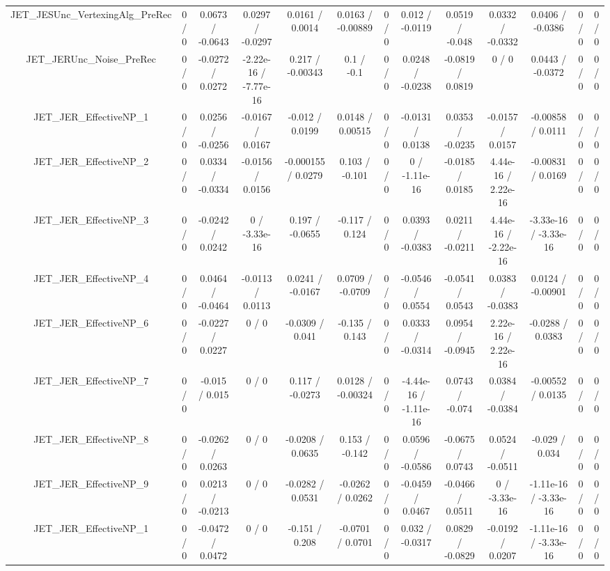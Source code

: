 \documentclass[10pt]{article}
\begin{document}
\begin{table}[htbp]
\begin{center}
\begin{tabular}{|c|c|c|c|c|c|c|c|c|c|c|c|c|}
  JET_JESUnc_VertexingAlg_PreRec & 0 / 0 & 0.0673 / -0.0643 & 0.0297 / -0.0297 & 0.0161 / 0.0014 & 0.0163 / -0.00889 & 0 / 0 & 0.012 / -0.0119 & 0.0519 / -0.048 & 0.0332 / -0.0332 & 0.0406 / -0.0386 & 0 / 0 & 0 / 0 \\ 
  JET_JERUnc_Noise_PreRec & 0 / 0 & -0.0272 / 0.0272 & -2.22e-16 / -7.77e-16 & 0.217 / -0.00343 & 0.1 / -0.1 & 0 / 0 & 0.0248 / -0.0238 & -0.0819 / 0.0819 & 0 / 0 & 0.0443 / -0.0372 & 0 / 0 & 0 / 0 \\ 
  JET_JER_EffectiveNP_1 & 0 / 0 & 0.0256 / -0.0256 & -0.0167 / 0.0167 & -0.012 / 0.0199 & 0.0148 / 0.00515 & 0 / 0 & -0.0131 / 0.0138 & 0.0353 / -0.0235 & -0.0157 / 0.0157 & -0.00858 / 0.0111 & 0 / 0 & 0 / 0 \\ 
  JET_JER_EffectiveNP_2 & 0 / 0 & 0.0334 / -0.0334 & -0.0156 / 0.0156 & -0.000155 / 0.0279 & 0.103 / -0.101 & 0 / 0 & 0 / -1.11e-16 & -0.0185 / 0.0185 & 4.44e-16 / 2.22e-16 & -0.00831 / 0.0169 & 0 / 0 & 0 / 0 \\ 
  JET_JER_EffectiveNP_3 & 0 / 0 & -0.0242 / 0.0242 & 0 / -3.33e-16 & 0.197 / -0.0655 & -0.117 / 0.124 & 0 / 0 & 0.0393 / -0.0383 & 0.0211 / -0.0211 & 4.44e-16 / -2.22e-16 & -3.33e-16 / -3.33e-16 & 0 / 0 & 0 / 0 \\ 
  JET_JER_EffectiveNP_4 & 0 / 0 & 0.0464 / -0.0464 & -0.0113 / 0.0113 & 0.0241 / -0.0167 & 0.0709 / -0.0709 & 0 / 0 & -0.0546 / 0.0554 & -0.0541 / 0.0543 & 0.0383 / -0.0383 & 0.0124 / -0.00901 & 0 / 0 & 0 / 0 \\ 
  JET_JER_EffectiveNP_6 & 0 / 0 & -0.0227 / 0.0227 & 0 / 0 & -0.0309 / 0.041 & -0.135 / 0.143 & 0 / 0 & 0.0333 / -0.0314 & 0.0954 / -0.0945 & 2.22e-16 / 2.22e-16 & -0.0288 / 0.0383 & 0 / 0 & 0 / 0 \\ 
  JET_JER_EffectiveNP_7 & 0 / 0 & -0.015 / 0.015 & 0 / 0 & 0.117 / -0.0273 & 0.0128 / -0.00324 & 0 / 0 & -4.44e-16 / -1.11e-16 & 0.0743 / -0.074 & 0.0384 / -0.0384 & -0.00552 / 0.0135 & 0 / 0 & 0 / 0 \\ 
  JET_JER_EffectiveNP_8 & 0 / 0 & -0.0262 / 0.0263 & 0 / 0 & -0.0208 / 0.0635 & 0.153 / -0.142 & 0 / 0 & 0.0596 / -0.0586 & -0.0675 / 0.0743 & 0.0524 / -0.0511 & -0.029 / 0.034 & 0 / 0 & 0 / 0 \\ 
  JET_JER_EffectiveNP_9 & 0 / 0 & 0.0213 / -0.0213 & 0 / 0 & -0.0282 / 0.0531 & -0.0262 / 0.0262 & 0 / 0 & -0.0459 / 0.0467 & -0.0466 / 0.0511 & 0 / -3.33e-16 & -1.11e-16 / -3.33e-16 & 0 / 0 & 0 / 0 \\ 
  JET_JER_EffectiveNP_1 & 0 / 0 & -0.0472 / 0.0472 & 0 / 0 & -0.151 / 0.208 & -0.0701 / 0.0701 & 0 / 0 & 0.032 / -0.0317 & 0.0829 / -0.0829 & -0.0192 / 0.0207 & -1.11e-16 / -3.33e-16 & 0 / 0 & 0 / 0 \\ 

\end{tabular}
\end{center}
\end{table}
\end{document}
